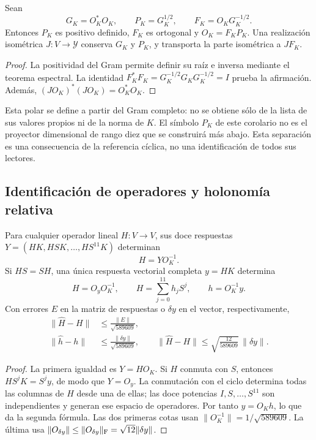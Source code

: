 \begin{corollary}
\label{lib01:polar}
Sean
\[
 G_K=O_K^*O_K,\qquad P_K=G_K^{1/2},\qquad
 F_K=O_KG_K^{-1/2}.
\]
Entonces \(P_K\) es positivo definido, \(F_K\) es ortogonal y
\(O_K=F_KP_K\). Una realización isométrica \(J:V\to\mathcal Y\)
conserva \(G_K\) y \(P_K\), y transporta la parte isométrica a
\(JF_K\).
\end{corollary}
\begin{proof}
La positividad del Gram permite definir su raíz e inversa mediante el
teorema espectral. La identidad
\(F_K^*F_K=G_K^{-1/2}G_KG_K^{-1/2}=I\) prueba la afirmación.
Además, \((JO_K)^*(JO_K)=O_K^*O_K\).
\end{proof}

Esta polar se define a partir del Gram completo: no se obtiene sólo de la
lista de sus valores propios ni de la norma de \(K\). El símbolo
\(P_K\) de este corolario no es el proyector dimensional de rango diez
que se construirá más abajo. Esta separación es una consecuencia de la
referencia cíclica, no una identificación de todos sus lectores.

\subsection{Identificación de operadores y holonomía relativa}
\label{lib01:identificacion}

\begin{theorem}
\label{lib01:operadores}
Para cualquier operador lineal \(H:V\to V\), sus doce respuestas
\(Y=(HK,HSK,\ldots,HS^{11}K)\) determinan
\[
 H=YO_K^{-1}.
\]
Si \(HS=SH\), una única respuesta vectorial completa \(y=HK\)
determina
\begin{equation}
 H=O_yO_K^{-1},\qquad
 H=\sum_{j=0}^{11}h_jS^j,\qquad h=O_K^{-1}y.
 \label{lib01:filtro}
\end{equation}
Con errores \(E\) en la matriz de respuestas o \(\delta y\) en el
vector, respectivamente,
\begin{align}
 \|\widehat H-H\|&\leq\frac{\|E\|}{\sqrt{589609}},
 \label{lib01:error-matriz}\\
 \|\widehat h-h\|&\leq\frac{\|\delta y\|}{\sqrt{589609}},\qquad
 \|\widehat H-H\|\leq\sqrt{\frac{12}{589609}}\,\|\delta y\|.
 \label{lib01:error-filtro}
\end{align}
\end{theorem}
\begin{proof}
La primera igualdad es \(Y=HO_K\). Si \(H\) conmuta con \(S\),
entonces \(HS^jK=S^jy\), de modo que \(Y=O_y\). La conmutación con
el ciclo determina todas las columnas de \(H\) desde una de ellas;
las doce potencias \(I,S,\ldots,S^{11}\) son independientes y generan
ese espacio de operadores. Por tanto \(y=O_Kh\), lo que da la
segunda fórmula. Las dos primeras cotas usan
\(\|O_K^{-1}\|=1/\sqrt{589609}\). La última usa
\(\|O_{\delta y}\|\leq\|O_{\delta y}\|_{\rm F}
=\sqrt{12}\|\delta y\|\).
\end{proof}

